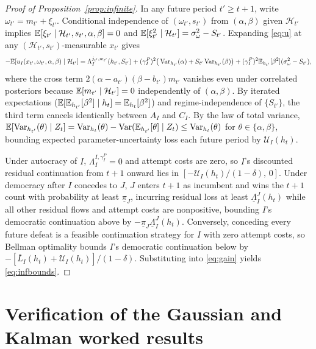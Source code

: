 \begin{proof}[Proof of Proposition~\ref{prop:infinite}]
In any future period $t'\ge t+1$, write $\omega_{t'}=m_{t'}+\xi_{t'}$. Conditional independence of $(\omega_{t'},s_{t'})$ from $(\alpha,\beta)$ given $\mathcal H_{t'}$ implies $\mathbb E[\xi_{t'}\mid\mathcal H_{t'},s_{t'},\alpha,\beta]=0$ and $\mathbb E[\xi_{t'}^2\mid\mathcal H_{t'}]=\sigma_\omega^2-S_{t'}$. Expanding \eqref{eq:u} at any $(\mathcal H_{t'},s_{t'})$-measurable $x_{t'}$ gives
\[
 -\mathbb E[u_I(x_{t'},\omega_{t'},\alpha,\beta)\mid\mathcal H_{t'}]
 =\Lambda_I^{j_{t'},w_{t'}}(h_{t'},S_{t'})
 +(\gamma_I^P)^2\big(\operatorname{Var}_{h_{t'}}(\alpha)+S_{t'}\operatorname{Var}_{h_{t'}}(\beta)\big)
 +(\gamma_I^P)^2\mathbb E_{h_{t'}}[\beta^2](\sigma_\omega^2-S_{t'}),
\]
where the cross term $2(\alpha-a_{t'})(\beta-b_{t'})m_{t'}$ vanishes even under correlated posteriors because $\mathbb E[m_{t'}\mid\mathcal H_{t'}]=0$ independently of $(\alpha,\beta)$. By iterated expectations ($\mathbb E[\mathbb E_{h_{t'}}[\beta^2]\mid h_t]=\mathbb E_{h_t}[\beta^2]$) and regime-independence of $\{S_{t'}\}$, the third term cancels identically between $A_I$ and $C_I$. By the law of total variance, $\mathbb E[\operatorname{Var}_{h_{t'}}(\theta)\mid Z_t]=\operatorname{Var}_{h_t}(\theta)-\operatorname{Var}(\mathbb E_{h_{t'}}[\theta]\mid Z_t)\le\operatorname{Var}_{h_t}(\theta)$ for $\theta\in\{\alpha,\beta\}$, bounding expected parameter-uncertainty loss each future period by $\mathcal U_I(h_t)$.

Under autocracy of $I$, $\Lambda_I^{I,\gamma_I^P}=0$ and attempt costs are zero, so $I$'s discounted residual continuation from $t+1$ onward lies in $[-\mathcal U_I(h_t)/(1-\delta),\,0]$. Under democracy after $I$ concedes to $J$, $J$ enters $t+1$ as incumbent and wins the $t+1$ count with probability at least $\underline\pi_J$, incurring residual loss at least $\underline\Lambda_I^J(h_t)$ while all other residual flows and attempt costs are nonpositive, bounding $I$'s democratic continuation above by $-\underline\pi_J\underline\Lambda_I^J(h_t)$. Conversely, conceding every future defeat is a feasible continuation strategy for $I$ with zero attempt costs, so Bellman optimality bounds $I$'s democratic continuation below by $-[\bar L_I(h_t)+\mathcal U_I(h_t)]/(1-\delta)$. Substituting into \eqref{eq:gain} yields \eqref{eq:infbounds}.
\end{proof}

\section{Verification of the Gaussian and Kalman worked results}\label{app:stationary}


